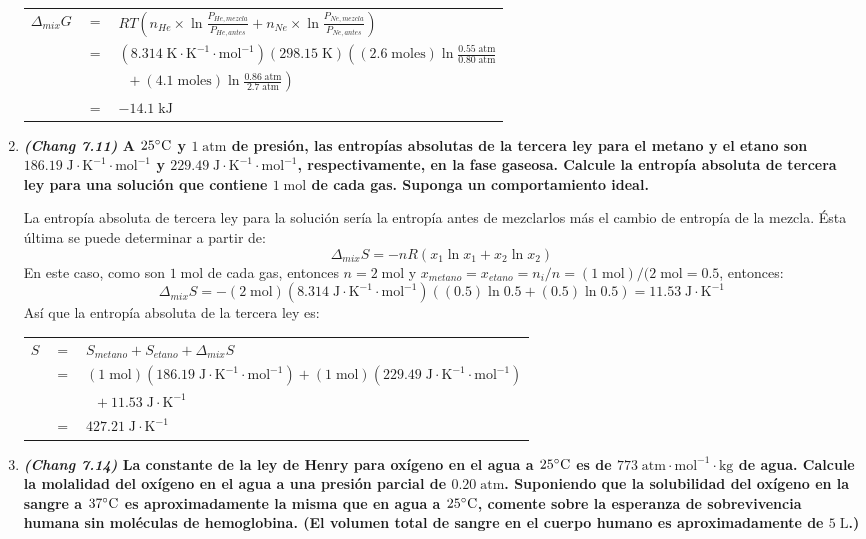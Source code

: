 \documentclass[a4paper,12pt]{article}
\begin{document}
\begin{enumerate}
\begin{tabular}{r c l}
$\Delta_{mix}G$ & $=$ & $RT(n_{He}\times\ln\frac{P_{He,mezcla}}{P_{He,antes}}+n_{Ne}\times\ln\frac{P_{Ne,mezcla}}{P_{Ne,antes}})$ \\
& $=$ & $(8.314\;\mbox{K}\cdot\mbox{K}^{-1}\cdot\mbox{mol}^{-1})(298.15\;\mbox{K})\left((2.6\;\mbox{moles})\ln\frac{0.55\;\mbox{atm}}{0.80\;\mbox{atm}}\right.$ \\
& & $\;\;+\left.(4.1\;\mbox{moles})\ln\frac{0.86\;\mbox{atm}}{2.7\;\mbox{atm}}\right)$ \\
& $=$ & $-14.1\;\mbox{kJ}$
\end{tabular}

 \item \textbf{\textit{(Chang 7.11)} A $25\celsius$ y $1\;\mbox{atm}$ de presi\'on, las entrop\'ias absolutas de la tercera ley para el metano y el etano son $186.19\;\mbox{J}\cdot\mbox{K}^{-1}\cdot\mbox{mol}^{-1}$ y $229.49\;\mbox{J}\cdot\mbox{K}^{-1}\cdot\mbox{mol}^{-1}$, respectivamente, en la fase gaseosa. Calcule la entrop\'ia absoluta de tercera ley para una soluci\'on que contiene $1\;\mbox{mol}$ de cada gas. Suponga un comportamiento ideal.} %

La entrop\'ia absoluta de tercera ley para la soluci\'on ser\'ia la entrop\'ia antes de mezclarlos m\'as el cambio de entrop\'ia de la mezcla. \'Esta \'ultima se puede determinar a partir de:
$$\Delta_{mix}S=-nR(x_1\ln x_1+x_2\ln x_2)$$
En este caso, como son $1\;\mbox{mol}$ de cada gas, entonces $n=2\;\mbox{mol}$ y $x_{metano}=x_{etano}=n_i/n=(1\;\mbox{mol})/(2\;\mbox{mol}=0.5$, entonces:
$$\Delta_{mix}S=-(2\;\mbox{mol})(8.314\;\mbox{J}\cdot\mbox{K}^{-1}\cdot\mbox{mol}^{-1})((0.5)\ln 0.5+(0.5)\ln 0.5)=11.53\;\mbox{J}\cdot\mbox{K}^{-1}$$
As\'i que la entrop\'ia absoluta de la tercera ley es:

\begin{tabular}{r c l}
$S$ & $=$ & $S_{metano}+S_{etano}+\Delta_{mix}S$ \\
& $=$ & $(1\;\mbox{mol})(186.19\;\mbox{J}\cdot\mbox{K}^{-1}\cdot\mbox{mol}^{-1})+(1\;\mbox{mol})(229.49\;\mbox{J}\cdot\mbox{K}^{-1}\cdot\mbox{mol}^{-1})$ \\
& & $\;\;+11.53\;\mbox{J}\cdot\mbox{K}^{-1}$ \\
& $=$ & $427.21\;\mbox{J}\cdot\mbox{K}^{-1}$
\end{tabular}

 \item \textbf{\textit{(Chang 7.14)} La constante de la ley de Henry para ox\'igeno en el agua a $25\celsius$ es de $773\;\mbox{atm}\cdot\mbox{mol}^{-1}\cdot\mbox{kg}$ de agua. Calcule la molalidad del ox\'igeno en el agua a una presi\'on parcial de $0.20\;\mbox{atm}$. Suponiendo que la solubilidad del ox\'igeno en la sangre a $37\celsius$ es aproximadamente la misma que en agua a $25\celsius$, comente sobre la esperanza de sobrevivencia humana sin mol\'eculas de hemoglobina. (El volumen total de sangre en el cuerpo humano es aproximadamente de $5\;\mbox{L}$.)} %


\end{enumerate}
\end{document}
